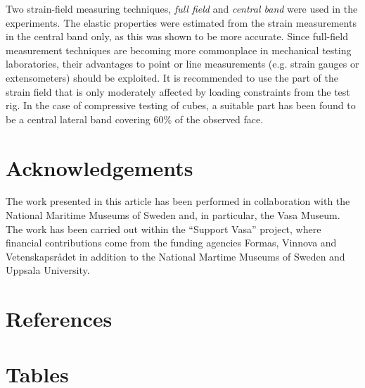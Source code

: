 \documentclass[3p]{elsarticle}
\begin{document}
Two strain-field measuring techniques, \textit{full field} 
and \textit{central band}
were used in the experiments. The elastic properties were estimated from the 
strain measurements in the central band only, as this was shown to be more accurate. 
Since full-field measurement techniques are becoming more commonplace in mechanical 
testing laboratories, their advantages to point or line measurements 
(e.g. strain gauges or extensometers) should be exploited. 
It is recommended to use the part of the strain field that is only moderately 
affected by loading constraints from the test rig. In the case of compressive 
testing of cubes, a suitable part has been found to be a central lateral band 
covering 60\% of the observed face. 




\section*{Acknowledgements}
The work presented in this article has been performed in collaboration with the National Maritime Museums of Sweden
and, in particular, the Vasa Museum. The work has been carried
out within the ``Support Vasa'' project, where financial contributions come from the funding agencies  Formas, Vinnova and
Vetenskapsr{\aa}det in addition to the National Martime Museums of Sweden and Uppsala University. 
\section*{References}




\pagebreak
\section*{Tables}
\end{document}

